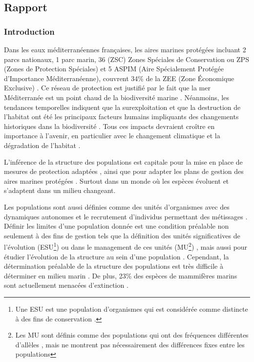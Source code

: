 \documentclass[a4paper,12pt,twoside]{article}\usepackage[]{graphicx}\usepackage[]{color}
\begin{document}
\begin {bibunit} [newbst]
\part*{Rapport}
\setcounter{section}{0}

\section{Introduction}

Dans les eaux méditerranéennes françaises, les aires marines protégées incluant 2 parcs nationaux, 1 parc marin, 36 (ZSC) Zones Spéciales de Conservation ou ZPS (Zones de Protection Spéciales) et 5 ASPIM (Aire Spécialement Protégée d’Importance Méditerranéenne), couvrent 34\% de la ZEE (Zone Économique Exclusive) \citep{workshop}. Ce réseau de protection est justifié par le fait que la mer Méditerranée est un point chaud de la biodiversité marine \citep{coll2010biodiversity}. Néanmoins, les tendances temporelles indiquent que la surexploitation et que la destruction de l'habitat ont été les principaux facteurs humains impliquants des changements historiques dans la biodiversité \citep{danovaro2003pollution, coll2010biodiversity}. Tous ces impacts devraient croître en importance à l'avenir, en particulier avec le changement climatique et la dégradation de l'habitat \citep{coll2012mediterranean}. 

L’inférence de la structure des populations est capitale pour la mise en place de mesures de protection adaptées \citep{hoelzel1998genetic}, ainsi que pour adapter les plans de gestion des aires marines protégées \citep{MPA}. Surtout dans un monde où les espèces évoluent et s'adaptent dans un milieu changeant.

Les populations sont aussi définies comme des unités d'organismes avec des dynamiques autonomes et le recrutement d'individus permettant des métissages \citep{krutzen2004population}. Définir les limites d'une population donnée est une condition préalable non seulement à des fins de gestion tels que la définition des unités significatives de l'évolution (ESU\footnote{Une ESU est une population d'organismes qui est considérée comme distincte à des fins de conservation .}) \citep{hoelzel1998genetic, carnabuci2016} ou dans le management de ces unités (MU\footnote{Les MU sont définis comme des populations qui ont des fréquences différentes d'allèles , mais ne montrent pas nécessairement des différences fixes entre les populations}) \citep{ryder1986species, hawkins2016fisheries}, mais aussi pour étudier l'évolution de la structure au sein d'une population \citep{carnabuci2016}. Cependant, la détermination préalable de la structure des populations est très difficile à déterminer en milieu marin \citep{Jonsson2016}. De plus, 23\% des espèces de mammifères marins sont actuellement menacées d’extinction \citep{schipper2008status}. 


\end{bibunit}
\end{document}
